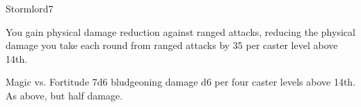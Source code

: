 \begin{spellsection}{Stormlord}{7}
\begin{spellheader}
\end{spellheader}
\begin{spellcontent}
    \begin{spelltargetinginfo}
    \end{spelltargetinginfo}
    \begin{spelleffects}
        \spelleffect You gain physical damage reduction against ranged attacks, reducing the physical damage you take each round from ranged attacks by 35  per caster level above 14th.
        \spelldur \durshort \dismissable
    \end{spelleffects}
\end{spellcontent}
\begin{spellsubcontent}
    \begin{spelltargetinginfo}
    \end{spelltargetinginfo}
    \begin{spelleffects}
        \begin{spellattack}{Magic vs. Fortitude}
            \spellsuccess 7d6 bludgeoning damage \add d6 per four caster levels above 14th.
            \spellfailure As above, but half damage.
        \end{spellattack}
    \end{spelleffects}
\end{spellsubcontent}
\begin{spellfooter}
\end{spellfooter}
\end{spellsection}

